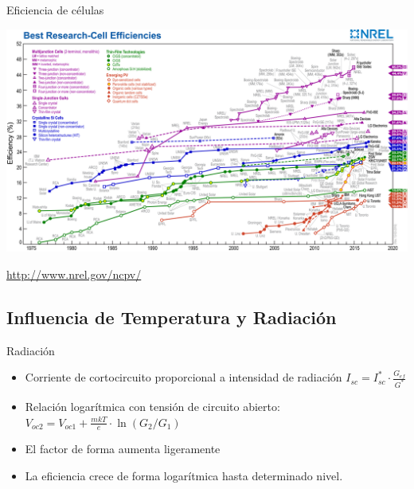\documentclass[xcolor={usenames,svgnames,dvipsnames}]{beamer}
\begin{document}
\begin{frame}[plain,label={sec:org9c23554}]{Eficiencia de células}
\begin{center}
\includegraphics[width=1.2\textwidth]{../figs/efficiency_chart_nrel.jpg}
\end{center}

\url{http://www.nrel.gov/ncpv/}
\end{frame}

\subsection{Influencia de Temperatura y Radiación}
\label{sec:org1921e13}

\begin{frame}[label={sec:org833451b}]{Radiación}
\begin{itemize}
\item \alert{Corriente de cortocircuito proporcional a intensidad de radiación}
\(I_{sc} = I^*_{sc}\cdot\frac{G_{ef}}{G^{*}}\)

\item Relación logarítmica con tensión de circuito abierto:
\(V_{oc2}=V_{oc1}+\frac{mkT}{e}\cdot\ln(G_2/G_1)\)

\item El factor de forma aumenta ligeramente

\item La eficiencia crece de forma logarítmica hasta determinado nivel.
\end{itemize}
\end{frame}
\end{document}

